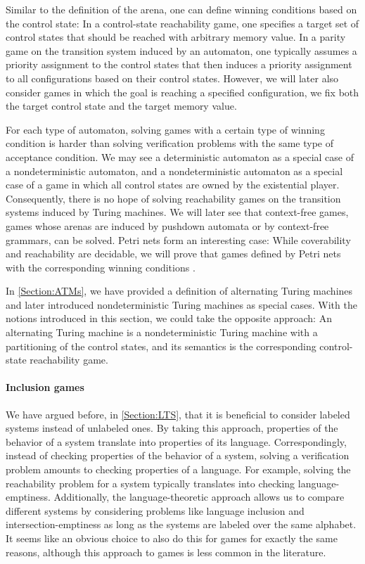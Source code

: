 \documentclass[../../diss.tex]{subfiles}
\begin{document}
Similar to the definition of the arena, one can define winning conditions based on the control state:
In a control-state reachability game, one specifies a target set of control states that should be reached with arbitrary memory value.
In a parity game on the transition system induced by an automaton, one typically assumes a priority assignment to the control states that then induces a priority assignment to all configurations based on their control states.
However, we will later also consider games in which the goal is reaching a specified configuration, \ie we fix both the target control state and the target memory value.

For each type of automaton, solving games with a certain type of winning condition is harder than solving verification problems with the same type of acceptance condition.
We may see a deterministic automaton as a special case of a nondeterministic automaton, and a nondeterministic automaton as a special case of a game in which all control states are owned by the existential player.
Consequently, there is no hope of solving reachability games on the transition systems induced by Turing machines.
We will later see that context-free games, games whose arenas are induced by pushdown automata or by context-free grammars, can be solved.
Petri nets form an interesting case: While coverability and reachability are decidable, we will prove that games defined by Petri nets with the corresponding winning conditions .

\begin{remark*}
    In \cref{Section:ATMs}, we have provided a definition of alternating Turing machines and later introduced nondeterministic Turing machines as special cases.
    With the notions introduced in this section, we could take the opposite approach: An alternating Turing machine is a nondeterministic Turing machine with a partitioning of the control states, and its semantics is the corresponding control-state reachability game.
\end{remark*}

\paragraph{Inclusion games}

We have argued before, \eg in \cref{Section:LTS}, that it is beneficial to consider labeled systems instead of unlabeled ones.
By taking this approach, properties of the behavior of a system translate into properties of its language.
Correspondingly, instead of checking properties of the behavior of a system, solving a verification problem amounts to checking properties of a language.
For example, solving the reachability problem for a system typically translates into checking language-emptiness.
Additionally, the language-theoretic approach allows us to compare different systems by considering problems like language inclusion and intersection-emptiness as long as the systems are labeled over the same alphabet.
It seems like an obvious choice to also do this for games for exactly the same reasons, although this approach to games is less common in the literature.
\end{document}
